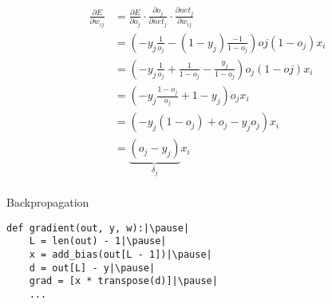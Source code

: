 \begin{frame}
  \begin{equation*}
    \begin{split}
      \frac{\partial E}{\partial w_{ij}} & = \frac{\partial E}{\partial o_j}
    \cdot \frac{\partial o_j}{\partial net_j} \cdot \frac{\partial
    net_j}{\partial w_{ij}} \\
    & = (-y_j \frac{1}{o_j} - (1 - y_j) \frac{-1}{1 - o_j}) oj(1 - o_j) x_i \\
    & = (-y_j \frac{1}{o_j} + \frac{1}{1 - o_j} - \frac{y_j}{1 - o_j}) o_j(1 - oj) x_i \\
    & = (-y_j \frac{1 - o_j}{o_j} + 1 - y_j) o_j x_i \\
    & = (-y_j (1 - o_j) + o_j - y_j o_j) x_i \\
    & = \underbrace{(o_j - y_j)}_{\delta_j} x_i \\
  \end{split}
\end{equation*}
\end{frame}

\begin{frame}[fragile]
  \begin{block}{Backpropagation}
    \begin{lstlisting}
def gradient(out, y, w):|\pause|
    L = len(out) - 1|\pause|
    x = add_bias(out[L - 1])|\pause|
    d = out[L] - y|\pause|
    grad = [x * transpose(d)]|\pause|
    ...
    \end{lstlisting}
  \end{block}
\end{frame}

